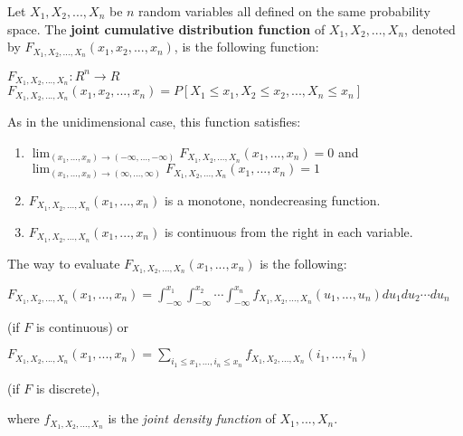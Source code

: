 \documentclass[12pt]{article}
\begin{document}
Let $X_1, X_2, ..., X_n$ be $n$ random variables all defined on the same probability space. The \textbf{joint cumulative distribution function} of $X_1, X_2, ..., X_n$, denoted by $F_{X_1, X_2, ..., X_n}(x_1,x_2,...,x_n)$, is the following function:\\
\par
$F_{X_1, X_2, ..., X_n}: R^n \to R$\\
$F_{X_1, X_2, ..., X_n}(x_1,x_2,...,x_n) = P[X_1 \leq x_1, X_2 \leq x_2, ... , X_n \leq x_n]$\\
\par
As in the unidimensional case, this function satisfies:\\
\par
\begin{enumerate}
\item $\lim_{(x_1,...,x_n) \to (-\infty,...,-\infty)}{F_{X_1, X_2, ..., X_n}(x_1,...,x_n)} = 0$  and  $\lim_{(x_1,...,x_n) \to (\infty,...,\infty)}{F_{X_1, X_2, ..., X_n}(x_1,...,x_n)} = 1$
\item $F_{X_1, X_2, ..., X_n}(x_1,...,x_n)$ is a monotone, nondecreasing function.
\item $F_{X_1, X_2, ..., X_n}(x_1,...,x_n)$ is continuous from the right in each variable.
\end{enumerate}

The way to evaluate $F_{X_1, X_2, ..., X_n}(x_1,...,x_n)$ is the following:\\
\par
$F_{X_1, X_2, ..., X_n}(x_1,...,x_n) = \int_{-\infty}^{x_1}{   \int_{-\infty}^{x_2}{ \cdots \int_{-\infty}^{x_n}{   f_{X_1, X_2, ..., X_n}(u_1,...,u_n)    du_1 du_2 \cdots du_n}}}$\\
\par
(if $F$ is continuous) or\\
\par
$F_{X_1, X_2, ..., X_n}(x_1,...,x_n) = \sum_{i_1 \leq x_1, ... , i_n \leq x_n}^{} {  f_{X_1, X_2, ..., X_n}(i_1,...,i_n)  }$\\
\par
(if $F$ is discrete), \\
\par
where $f_{X_1, X_2, ..., X_n}$ is the \emph{joint density function} of  $X_1, ..., X_n$.
\end{document}
